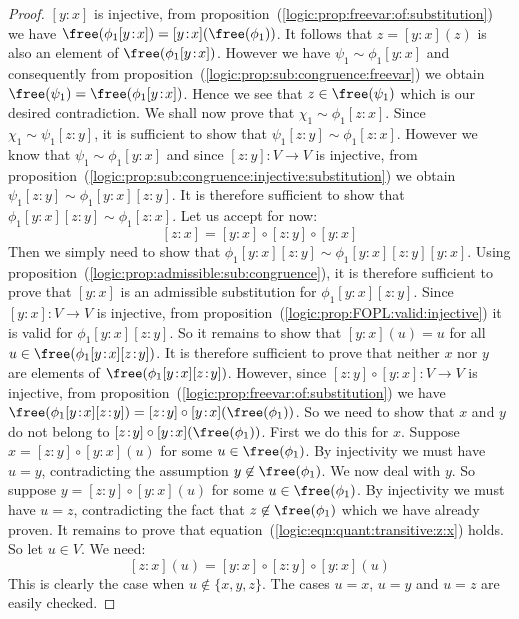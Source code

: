 \begin{proof}
$[y\!:\!x]$ is injective, from
proposition~(\ref{logic:prop:freevar:of:substitution}) we have
$\free(\phi_{1}[y\!:\!x]) = [y\!:\!x](\free(\phi_{1}))$. It follows
that $z=[y\!:\!x](z)$ is also an element of
$\free(\phi_{1}[y\!:\!x])$. However we have
$\psi_{1}\sim\phi_{1}[y\!:\!x]$ and consequently from
proposition~(\ref{logic:prop:sub:congruence:freevar}) we obtain
$\free(\psi_{1})=\free(\phi_{1}[y\!:\!x])$. Hence we see that
$z\in\free(\psi_{1})$ which is our desired contradiction. We shall
now prove that $\chi_{1}\sim\phi_{1}[z\!:\!x]$. Since
$\chi_{1}\sim\psi_{1}[z\!:\!y]$, it is sufficient to show that
$\psi_{1}[z\!:\!y]\sim\phi_{1}[z\!:\!x]$. However we know that
$\psi_{1}\sim\phi_{1}[y\!:\!x]$ and since $[z\!:\!y]:V\to V$ is
injective, from
proposition~(\ref{logic:prop:sub:congruence:injective:substitution})
we obtain $\psi_{1}[z\!:\!y]\sim\phi_{1}[y\!:\!x][z\!:\!y]$. It is
therefore sufficient to show that
$\phi_{1}[y\!:\!x][z\!:\!y]\sim\phi_{1}[z\!:\!x]$. Let us accept for
now:
    \begin{equation}\label{logic:eqn:quant:transitive:z:x}
    [z\!:\!x]=[y\!:\!x]\circ[z\!:\!y]\circ[y\!:\!x]
    \end{equation}
Then we simply need to show that
$\phi_{1}[y\!:\!x][z\!:\!y]\sim\phi_{1}[y\!:\!x][z\!:\!y][y\!:\!x]$.
Using proposition~(\ref{logic:prop:admissible:sub:congruence}), it
is therefore sufficient to prove that $[y\!:\!x]$ is an admissible
substitution for $\phi_{1}[y\!:\!x][z\!:\!y]$. Since $[y\!:\!x]:V\to
V$ is injective, from
proposition~(\ref{logic:prop:FOPL:valid:injective}) it is valid for
$\phi_{1}[y\!:\!x][z\!:\!y]$. So it remains to show that
$[y\!:\!x](u)=u$ for all $u\in\free(\phi_{1}[y\!:\!x][z\!:\!y])$. It
is therefore sufficient to prove that neither $x$ nor $y$ are
elements of $\free(\phi_{1}[y\!:\!x][z\!:\!y])$. However, since
$[z\!:\!y]\circ[y\!:\!x]:V\to V$ is injective, from
proposition~(\ref{logic:prop:freevar:of:substitution}) we have
$\free(\phi_{1}[y\!:\!x][z\!:\!y])=[z\!:\!y]\circ[y\!:\!x](\free(\phi_{1}))$.
So we need to show that $x$ and $y$ do not belong to
$[z\!:\!y]\circ[y\!:\!x](\free(\phi_{1}))$. First we do this for
$x$. Suppose $x=[z\!:\!y]\circ[y\!:\!x](u)$ for some
$u\in\free(\phi_{1})$. By injectivity we must have $u=y$,
contradicting the assumption $y\not\in\free(\phi_{1})$. We now deal
with $y$. So suppose $y=[z\!:\!y]\circ[y\!:\!x](u)$ for some
$u\in\free(\phi_{1})$. By injectivity we must have $u=z$,
contradicting the fact that $z\not\in\free(\phi_{1})$ which we have
already proven. It remains to prove that
equation~(\ref{logic:eqn:quant:transitive:z:x}) holds. So let $u\in
V$. We need:
    \[
    [z\!:\!x](u)=[y\!:\!x]\circ[z\!:\!y]\circ[y\!:\!x](u)
    \]
This is clearly the case when $u\not\in\{x,y,z\}$. The cases $u=x$,
$u=y$ and $u=z$ are easily checked.
\end{proof}

